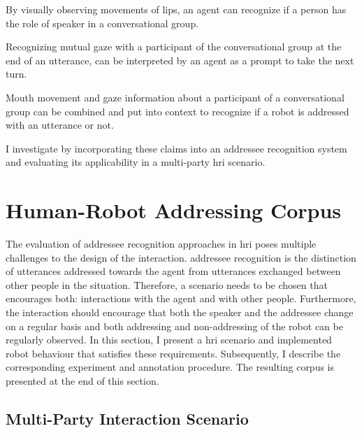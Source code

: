 \newcommand{\hypmekahone}{By visually observing movements of lips, an agent can recognize if a person has the role of \gls{speaker} in a \gls{conversational group}.}
\begin{hyp3}
    \label{meka.h1}
    \hypmekahone
\end{hyp3}
\newcommand{\hypmekahtwo}{Recognizing mutual gaze with a participant of the \gls{conversational group} at the end of an utterance, can be interpreted by an agent as a prompt to take the next \gls{turn}.}
\begin{hyp3}
    \label{meka.h2}
    \hypmekahtwo
\end{hyp3}
\newcommand{\hypmekahthree}{Mouth movement and gaze information about a participant of a \gls{conversational group} can be combined and put into context to recognize if a \gls{robot} is addressed with an utterance or not.}
\begin{hyp3}
    \label{meka.h3}
    \hypmekahthree
\end{hyp3}
I investigate  by incorporating these claims into an \gls{addressee} recognition system and evaluating its applicability in a multi-party \gls{hri} scenario.

\section{Human-Robot Addressing Corpus}\label{sec.meka.corpus}

The evaluation of \gls{addressee} recognition approaches in \gls{hri} poses multiple challenges to the design of the interaction.
\Gls{addressee} recognition is the distinction of utterances addressed towards the agent from utterances exchanged between other people in the situation.
Therefore, a scenario needs to be chosen that encourages both: interactions with the agent and with other people.
Furthermore, the interaction should encourage that both the speaker and the \gls{addressee} change on a regular basis and both addressing and non-addressing of the \gls{robot} can be regularly observed.
In this section, I present a \gls{hri} scenario and implemented \gls{robot} behaviour that satisfies these requirements.
Subsequently, I describe the corresponding experiment and annotation procedure.
The resulting corpus is presented at the end of this section.

\subsection{Multi-Party Interaction Scenario}\label{sec:meka-scenario}

